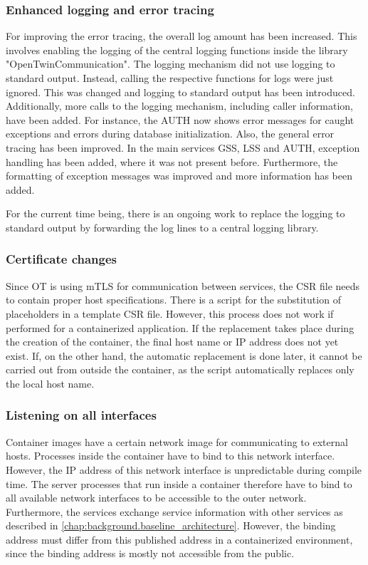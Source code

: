 \subsubsection*{Enhanced logging and error tracing}
For improving the error tracing, the overall log amount has been increased. This involves enabling the logging of the central logging functions inside the library "OpenTwinCommunication". The logging mechanism did not use logging to standard output. Instead, calling the respective functions for logs were just ignored. This was changed and logging to standard output has been introduced.
Additionally, more calls to the logging mechanism, including caller information, have been added. For instance, the \ac{AUTH} now shows error messages for caught exceptions and errors during database initialization.
Also, the general error tracing has been improved. In the main services \ac{GSS}, \ac{LSS} and \ac{AUTH}, exception handling has been added, where it was not present before. Furthermore, the formatting of exception messages was improved and more information has been added.

For the current time being, there is an ongoing work to replace the logging to standard output by forwarding the log lines to a central logging library.

\subsubsection*{Certificate changes}
Since \ac{OT} is using \ac{mTLS} for communication between services, the \ac{CSR} file needs to contain proper host specifications. There is a script for the substitution of placeholders in a template \ac{CSR} file. However, this process does not work if performed for a containerized application. If the replacement takes place during the creation of the container, the final host name or \ac{IP} address does not yet exist. If, on the other hand, the automatic replacement is done later, it cannot be carried out from outside the container, as the script automatically replaces only the local host name.


\subsubsection*{Listening on all interfaces}
Container images have a certain network image for communicating to external hosts. Processes inside the container have to bind to this network interface. However, the \ac{IP} address of this network interface is unpredictable during compile time. The server processes that run inside a container therefore have to bind to all available network interfaces to be accessible to the outer network.
Furthermore, the services exchange service information with other services as described in \autoref{chap:background.baseline_architecture}. However, the binding address must differ from this published address in a containerized environment, since the binding address is mostly not accessible from the public. 

